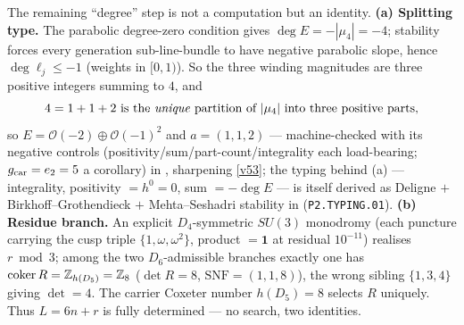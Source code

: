 \begin{winbox}
The remaining ``degree'' step is not a computation but an identity. \textbf{(a) Splitting type.} The
parabolic degree-zero condition gives $\deg E=-|\mu_4|=-4$; stability forces every generation
sub-line-bundle to have negative parabolic slope, hence $\deg\ell_j\le-1$ (weights in $[0,1)$). So the
three winding magnitudes are three positive integers summing to $4$, and
\[
  4=1+1+2\ \text{is the \emph{unique} partition of $|\mu_4|$ into three positive parts,}
\]
so $E=\mathcal O(-2)\oplus\mathcal O(-1)^2$ and $a=(1,1,2)$ --- machine-checked with its negative
controls (positivity/sum/part-count/integrality each load-bearing; $g_{\mathrm{car}}=e_2=5$ a corollary) in
, sharpening \vref{v53}; the typing behind (a) --- integrality,
positivity $=h^0{=}0$, sum $=-\deg E$ --- is itself derived as Deligne $+$ Birkhoff--Grothendieck $+$
Mehta--Seshadri stability in  (\texttt{P2.TYPING.01}).
\textbf{(b) Residue branch.} An explicit $D_4$-symmetric $SU(3)$ monodromy (each puncture carrying the
cusp triple $\{1,\omega,\omega^2\}$, product $=\mathbf1$ at residual $10^{-11}$) realises $r\bmod3$; among
the two $D_6$-admissible branches exactly one has $\operatorname{coker}R=\mathbb{Z}_{h(D_5)}=\mathbb{Z}_8$
($\det R=8$, $\mathrm{SNF}=(1,1,8)$), the wrong sibling $\{1,3,4\}$ giving $\det=4$. The carrier Coxeter
number $h(D_5)=8$ selects $R$ uniquely. Thus $L=6n+r$ is fully determined --- no search, two identities. \mE
\end{winbox}

